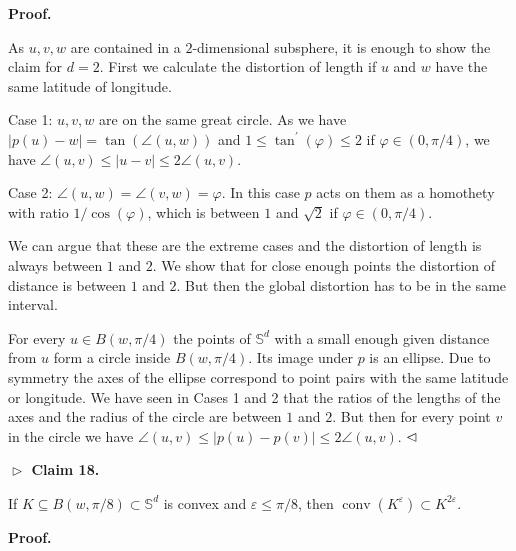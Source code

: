 \documentclass[10pt,a4paper]{amsart}
\begin{document}
\par\medskip\noindent\textbf{Proof.}\par
As $u,v,w$ are contained in a $2$-dimensional subsphere, it is enough to show the claim for $d=2$. First we calculate the distortion of length if $u$ and $w$ have the same latitude of longitude.
\par
\par
Case 1: $u,v,w$ are on the same great circle. As we have $|p(u)-w|=\tan(\angle(u,w))$ and $1\leq\tan^{\prime}(\varphi)\leq 2$ if $\varphi\in(0,\pi/4)$, we have $\angle(u,v)\leq|u-v|\leq 2\angle(u,v)$.
\par
\par
Case 2: $\angle(u,w)=\angle(v,w)=\varphi$. In this case $p$ acts on them as a homothety with ratio $1/\cos(\varphi)$, which is between $1$ and $\sqrt{2}$ if $\varphi\in(0,\pi/4)$.
\par
\par
We can argue that these are the extreme cases and the distortion of length is always between $1$ and $2$. We show that for close enough points the distortion of distance is between $1$ and $2$. But then the global distortion has to be in the same interval.
\par
\par
For every $u\in B(w,\pi/4)$ the points of $\mathbb{S}^{d}$ with a small enough given distance from $u$ form a circle inside $B(w,\pi/4)$. Its image under $p$ is an ellipse. Due to symmetry the axes of the ellipse correspond to point pairs with the same latitude or longitude. We have seen in Cases 1 and 2 that the ratios of the lengths of the axes and the radius of the circle are between $1$ and $2$. But then for every point $v$ in the circle we have $\angle(u,v)\leq|p(u)-p(v)|\leq 2\angle(u,v)$. $\hfill\vartriangleleft$
\par
\par
\par\medskip\noindent\textbf{$\vartriangleright$ Claim 18.}\par
If $K\subseteq B(w,\pi/8)\subset\mathbb{S}^{d}$ is convex and $\varepsilon\leq\pi/8$, then $\operatorname{conv}(K^{\varepsilon})\subset K^{2\varepsilon}$.
\par
\par
\par
\par
\par\medskip\noindent\textbf{Proof.}\par
\end{document}
